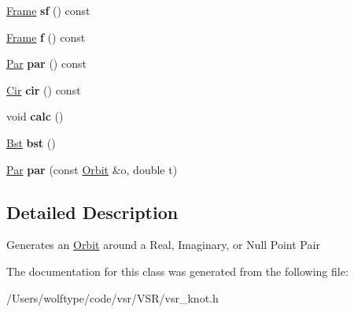 \begin{DoxyCompactItemize}
\item 
\hypertarget{classvsr_1_1_orbit_a9525324c3b9b51053918fd869521570f}{\hyperlink{classvsr_1_1_frame}{Frame} {\bfseries sf} () const }\label{classvsr_1_1_orbit_a9525324c3b9b51053918fd869521570f}

\item 
\hypertarget{classvsr_1_1_orbit_a45c2f77a670b08415fe4a64b3a7e7f49}{\hyperlink{classvsr_1_1_frame}{Frame} {\bfseries f} () const }\label{classvsr_1_1_orbit_a45c2f77a670b08415fe4a64b3a7e7f49}

\item 
\hypertarget{classvsr_1_1_orbit_a4dc7c73e1821dc4bd74a795406cc9124}{\hyperlink{namespacevsr_ae046793ece205351429a6346a66fd6eb}{Par} {\bfseries par} () const }\label{classvsr_1_1_orbit_a4dc7c73e1821dc4bd74a795406cc9124}

\item 
\hypertarget{classvsr_1_1_orbit_a9648ec8ed814bc866ba40090b47b0346}{\hyperlink{namespacevsr_a2744605aa828e495fc85463b7ae0d045}{Cir} {\bfseries cir} () const }\label{classvsr_1_1_orbit_a9648ec8ed814bc866ba40090b47b0346}

\item 
\hypertarget{classvsr_1_1_orbit_af4f9a98b452a56016cf6938bd6310336}{void {\bfseries calc} ()}\label{classvsr_1_1_orbit_af4f9a98b452a56016cf6938bd6310336}

\item 
\hypertarget{classvsr_1_1_orbit_a86ade2f0358561c75216c9721fad0207}{\hyperlink{namespacevsr_a9f737171e19572794ba7b6c12e8e679f}{Bst} {\bfseries bst} ()}\label{classvsr_1_1_orbit_a86ade2f0358561c75216c9721fad0207}

\item 
\hypertarget{classvsr_1_1_orbit_a8592b2747be2d950214b1221f420e312}{\hyperlink{namespacevsr_ae046793ece205351429a6346a66fd6eb}{Par} {\bfseries par} (const \hyperlink{classvsr_1_1_orbit}{Orbit} \&o, double t)}\label{classvsr_1_1_orbit_a8592b2747be2d950214b1221f420e312}

\end{DoxyCompactItemize}


\subsection{Detailed Description}
Generates an \hyperlink{classvsr_1_1_orbit}{Orbit} around a Real, Imaginary, or Null Point Pair 

The documentation for this class was generated from the following file\-:\begin{DoxyCompactItemize}
\item 
/\-Users/wolftype/code/vsr/\-V\-S\-R/vsr\-\_\-knot.\-h\end{DoxyCompactItemize}
